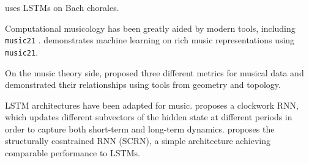 \documentclass[dissertation.tex]{subfiles}
\begin{document}
\cite{Liu2014} uses LSTMs on Bach chorales.

Computational musicology has been greatly aided by modern tools, including
\texttt{music21} \cite{Scott2015}. \cite{Cuthbert2011} demonstrates machine
learning on rich music representations using \texttt{music21}.

On the music theory side, \cite{Tymoczko2009} proposed three different metrics
for musical data and demonstrated their relationships using tools from geometry
and topology.

LSTM architectures have been adapted for music. \cite{Koutnik2014} proposes a
clockwork RNN, which updates different subvectors of the hidden state at
different periods in order to capture both short-term and long-term dynamics.
\cite{Mikolov2015} proposes the structurally cosntrained RNN (SCRN), a simple
architecture achieving comparable performance to LSTMs.

\printbibliography
\end{document}
